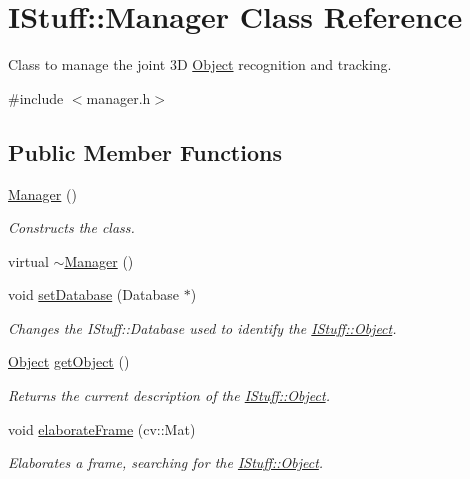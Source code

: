 \hypertarget{class_i_stuff_1_1_manager}{\section{I\-Stuff\-:\-:Manager Class Reference}
\label{class_i_stuff_1_1_manager}
}


Class to manage the joint 3\-D \hyperlink{class_i_stuff_1_1_object}{Object} recognition and tracking.  




{\ttfamily \#include $<$manager.\-h$>$}

\subsection*{Public Member Functions}
\begin{DoxyCompactItemize}
\item 
\hyperlink{class_i_stuff_1_1_manager_a1658ff9f18e38ccd9cb8b0b371b9c20b}{Manager} ()
\begin{DoxyCompactList}\small\item\em Constructs the class. \end{DoxyCompactList}\item 
virtual \hyperlink{class_i_stuff_1_1_manager_a322cad25d7007438b3a043ad02253d29}{$\sim$\-Manager} ()
\item 
void \hyperlink{class_i_stuff_1_1_manager_aa91ba11affc3ec961acaf81fc5c5e62d}{set\-Database} (Database $\ast$)
\begin{DoxyCompactList}\small\item\em Changes the I\-Stuff\-::\-Database used to identify the \hyperlink{class_i_stuff_1_1_object}{I\-Stuff\-::\-Object}. \end{DoxyCompactList}\item 
\hyperlink{class_i_stuff_1_1_object}{Object} \hyperlink{class_i_stuff_1_1_manager_a80d15a0a83976f63c357f65b20387e02}{get\-Object} ()
\begin{DoxyCompactList}\small\item\em Returns the current description of the \hyperlink{class_i_stuff_1_1_object}{I\-Stuff\-::\-Object}. \end{DoxyCompactList}\item 
void \hyperlink{class_i_stuff_1_1_manager_a47f17fa372382713bcc0f37aae006745}{elaborate\-Frame} (cv\-::\-Mat)
\begin{DoxyCompactList}\small\item\em Elaborates a frame, searching for the \hyperlink{class_i_stuff_1_1_object}{I\-Stuff\-::\-Object}. \end{DoxyCompactList}\item 

\end{DoxyCompactItemize}
